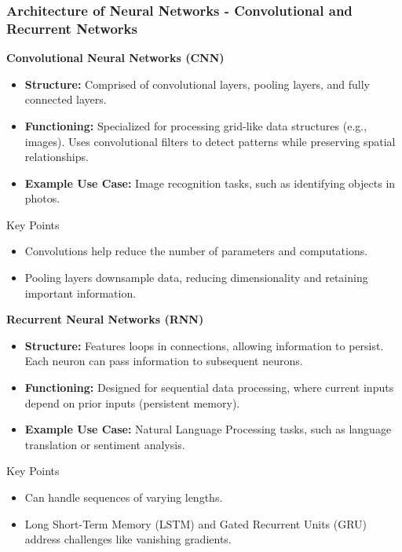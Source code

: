 \documentclass[aspectratio=169]{beamer}
\begin{document}
\begin{frame}[fragile]
  \frametitle{Architecture of Neural Networks - Convolutional and Recurrent Networks}
  
  \textbf{Convolutional Neural Networks (CNN)}
  
  \begin{itemize}
    \item \textbf{Structure:} Comprised of convolutional layers, pooling layers, and fully connected layers.
    \item \textbf{Functioning:} Specialized for processing grid-like data structures (e.g., images). Uses convolutional filters to detect patterns while preserving spatial relationships.
    \item \textbf{Example Use Case:} Image recognition tasks, such as identifying objects in photos.
  \end{itemize}

  \begin{block}{Key Points}
    \begin{itemize}
      \item Convolutions help reduce the number of parameters and computations.
      \item Pooling layers downsample data, reducing dimensionality and retaining important information.
    \end{itemize}
  \end{block}

  \textbf{Recurrent Neural Networks (RNN)}
  
  \begin{itemize}
    \item \textbf{Structure:} Features loops in connections, allowing information to persist. Each neuron can pass information to subsequent neurons.
    \item \textbf{Functioning:} Designed for sequential data processing, where current inputs depend on prior inputs (persistent memory).
    \item \textbf{Example Use Case:} Natural Language Processing tasks, such as language translation or sentiment analysis.
  \end{itemize}

  \begin{block}{Key Points}
    \begin{itemize}
      \item Can handle sequences of varying lengths.
      \item Long Short-Term Memory (LSTM) and Gated Recurrent Units (GRU) address challenges like vanishing gradients.
    \end{itemize}
  \end{block}

\end{frame}
\end{document}
